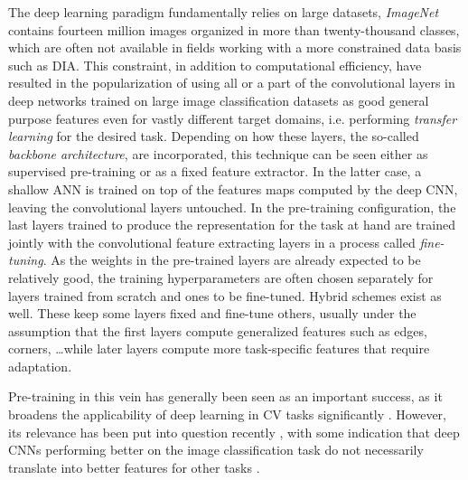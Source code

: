 The deep learning paradigm fundamentally relies on large datasets,
\emph{ImageNet} contains fourteen million images organized in more than
twenty-thousand classes, which are often not available in fields working with a
more constrained data basis such as DIA. This constraint, in addition to
computational efficiency, have resulted in the popularization of using all or a
part of the convolutional layers in deep networks trained on large image
classification datasets as good general purpose features even for vastly
different target domains, i.e. performing \emph{transfer learning} for the
desired task. Depending on how these layers, the so-called \emph{backbone
architecture}, are incorporated, this technique can be seen either as
supervised pre-training or as a fixed feature extractor.  In the latter case, a
shallow ANN is trained on top of the features maps computed by the deep CNN,
leaving the convolutional layers untouched. In the pre-training configuration,
the last layers trained to produce the representation for the task at hand are
trained jointly with the convolutional feature extracting layers in a process
called \emph{fine-tuning}. As the weights in the pre-trained layers are already
expected to be relatively good, the training hyperparameters are often chosen
separately for layers trained from scratch and ones to be fine-tuned. Hybrid
schemes exist as well. These keep some layers fixed and fine-tune others,
usually under the assumption that the first layers compute generalized features
such as edges, corners, \dots while later layers compute more task-specific
features that require adaptation.

Pre-training in this vein has generally been seen as an important success, as
it broadens the applicability of deep learning in CV tasks significantly
\cite{huh2016makes}. However, its relevance has been put into question recently
\cite{he2019rethinking,zoph2020rethinking}, with some indication that deep CNNs
performing better on the image classification task do not necessarily translate
into better features for other tasks \cite{kornblith2019better}. 

